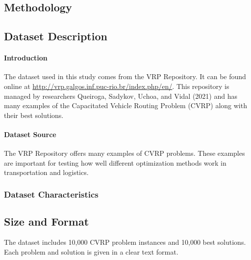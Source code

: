 \documentclass[
]{article}
\begin{document}
    \subsection{Methodology}

    \subsection{Dataset Description}

    \paragraph{Introduction}
    The dataset used in this study comes from the VRP Repository.
    It can be found online at \url{http://vrp.galgos.inf.puc-rio.br/index.php/en/}.
    This repository is managed by researchers Queiroga, Sadykov, Uchoa, and Vidal (2021) and has many examples of the Capacitated Vehicle Routing Problem (CVRP) along with their best solutions.

    \paragraph{Dataset Source}
    The VRP Repository offers many examples of CVRP problems.
    These examples are important for testing how well different optimization methods work in transportation and logistics.

    \subsubsection{Dataset Characteristics}

    \subsection{Size and Format}
    The dataset includes 10,000 CVRP problem instances and 10,000 best solutions. Each problem and solution is given in a clear text format.
\end{document}
